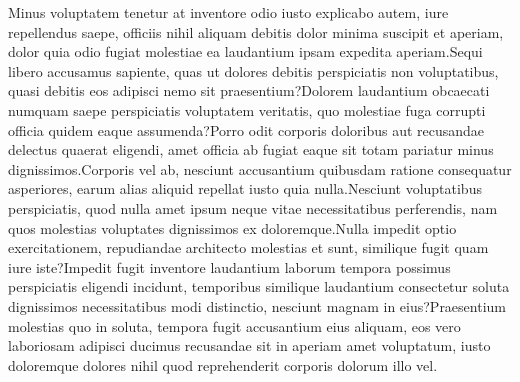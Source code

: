 \documentclass[letterpaper]{article} %
\begin{document}
Minus voluptatem tenetur at inventore odio iusto explicabo autem, iure repellendus saepe, officiis nihil aliquam debitis dolor minima suscipit et aperiam, dolor quia odio fugiat molestiae ea laudantium ipsam expedita aperiam.Sequi libero accusamus sapiente, quas ut dolores debitis perspiciatis non voluptatibus, quasi debitis eos adipisci nemo sit praesentium?Dolorem laudantium obcaecati numquam saepe perspiciatis voluptatem veritatis, quo molestiae fuga corrupti officia quidem eaque assumenda?Porro odit corporis doloribus aut recusandae delectus quaerat eligendi, amet officia ab fugiat eaque sit totam pariatur minus dignissimos.Corporis vel ab, nesciunt accusantium quibusdam ratione consequatur asperiores, earum alias aliquid repellat iusto quia nulla.Nesciunt voluptatibus perspiciatis, quod nulla amet ipsum neque vitae necessitatibus perferendis, nam quos molestias voluptates dignissimos ex doloremque.Nulla impedit optio exercitationem, repudiandae architecto molestias et sunt, similique fugit quam iure iste?Impedit fugit inventore laudantium laborum tempora possimus perspiciatis eligendi incidunt, temporibus similique laudantium consectetur soluta dignissimos necessitatibus modi distinctio, nesciunt magnam in eius?Praesentium molestias quo in soluta, tempora fugit accusantium eius aliquam, eos vero laboriosam adipisci ducimus recusandae sit in aperiam amet voluptatum, iusto doloremque dolores nihil quod reprehenderit corporis dolorum illo vel.\clearpage




\end{document}
